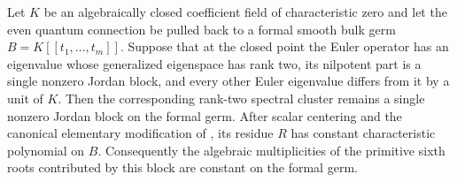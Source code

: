 \begin{proposition}
\label{prop:ranktwo-framed-germ}
%
%
Let $K$ be an algebraically closed coefficient field of characteristic zero
and let the even quantum connection be pulled back to a formal smooth bulk
germ $B=K[[t_1,\ldots,t_m]]$.  Suppose that at the closed point the Euler
operator has an eigenvalue whose generalized eigenspace has rank two, its
nilpotent part is a single nonzero Jordan block, and every other Euler
eigenvalue differs from it by a unit of $K$.  Then the corresponding
rank-two spectral cluster remains a single nonzero Jordan block on the
formal germ.  After scalar centering and the canonical elementary
modification of \cite[Section~2]{RuddM1}, its residue $R$ has
constant characteristic polynomial on $B$.  Consequently the algebraic
multiplicities of the primitive sixth roots contributed by this block are
constant on the formal germ.
\end{proposition}

